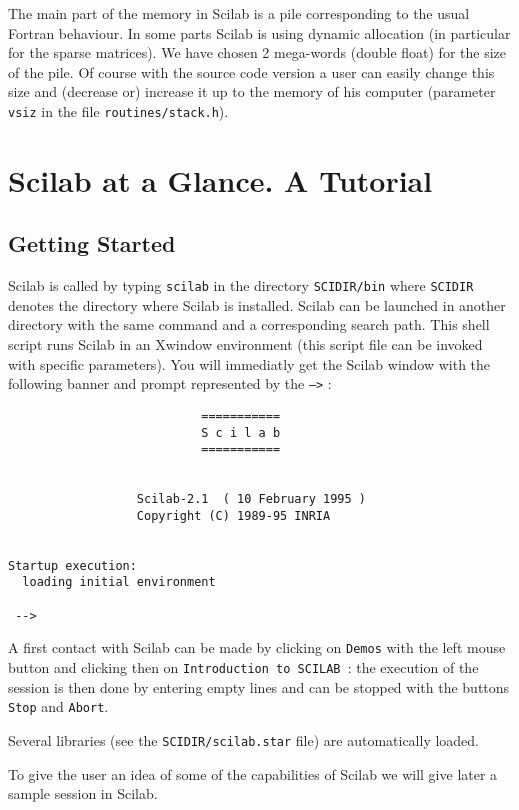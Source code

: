 The main part of the memory in Scilab is a pile corresponding to
the usual Fortran behaviour. In some parts Scilab is using dynamic allocation 
(in particular for the sparse matrices). 
We have chosen 2 mega-words (double float) for the size of the pile. 
Of course with the source code version a user can easily change this size and
(decrease or) increase it up to the memory of his computer (parameter 
{\tt vsiz} in the file {\tt routines/stack.h}).
 
\section{Scilab at a Glance. A Tutorial}

\subsection{Getting Started}

Scilab is called by typing {\tt scilab} in the directory {\tt SCIDIR/bin}
where {\tt SCIDIR} denotes the directory where Scilab is installed.
Scilab can be launched in another directory with the same command and
a corresponding search path.
This shell script  runs Scilab 
in an Xwindow environment (this script file can be invoked with
specific parameters).
You will immediatly get the Scilab window with the following banner and 
prompt represented by the {\tt -->} : 


\bigskip

\begin{verbatim}
                           ===========
                           S c i l a b
                           ===========
 
 
                  Scilab-2.1  ( 10 February 1995 ) 
                  Copyright (C) 1989-95 INRIA 
 
 
Startup execution:
  loading initial environment
   
 -->

\end{verbatim}


A first contact with Scilab can be made by clicking 
on {\tt Demos} with the left mouse button and clicking then on 
{\tt Introduction to SCILAB }: the 
execution of the session is then done by entering empty lines and can be
stopped with the buttons {\tt Stop} and {\tt Abort}.

  Several libraries
(see the {\tt SCIDIR/scilab.star} file) are automatically loaded.
	
To give the user an idea of some of the capabilities of Scilab
we will give later a sample session in Scilab.\\

